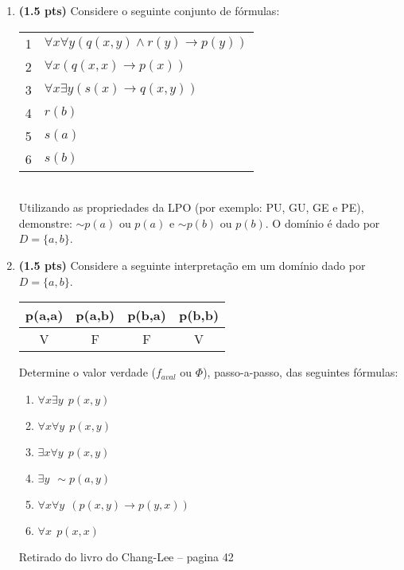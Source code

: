 \documentclass[11pt, a4paper,final]{article}
\begin{document}
\begin{enumerate}
\begin{comment}

\item {\bf (1.0 pt)} Utilizando o método de  {\em demonstração por condicional}  a validade do   argumento $ p \rightarrow u $, a partir das premissas:
$$ \{ p \vee q \rightarrow r,~ s \rightarrow \sim r \wedge \sim t,~ s \vee u \} ~\vdash~ p \rightarrow u $$
\end{comment}  


\item {\bf (1.5 pts)} Considere o seguinte conjunto de f\'ormulas: 

\begin{tabular}{ll}
1 &  $\forall x\forall y (q(x,y) \wedge r(y) \rightarrow p(y)) $ \\
2 &  $\forall x  (q(x,x) \rightarrow p(x))  $ \\
3 &  $\forall x \exists y ( s(x) \rightarrow q(x,y)) $ \\
4 &  $r(b)$ \\ 
5 &  $s(a)$ \\
6 &  $s(b)$ \\
\end{tabular}\\
Utilizando as propriedades da LPO (por exemplo: PU, GU, GE e PE), demonstre: $\sim p(a)$ ou $p(a)$ e $\sim p(b)$ ou $p(b)$.
O domínio é dado por $D=\{a,b\}$. 


\item {\bf (1.5 pts)} Considere a seguinte interpretação em um domínio dado por $D=\{a,b\}$. 

\begin{tabular}{c |c | c | c } \hline \hline 
p(a,a) & p(a,b)  & p(b,a) & p(b,b)  \\  \hline 
 V & F & F & V \\ \hline \hline 
\end{tabular}

Determine o valor verdade ($f_{aval}$  ou $\Phi $), passo-a-passo, das seguintes fórmulas:

\begin{enumerate}
\itemsep -2pt
\item $\forall x \exists y \:\: p(x,y) $
\item $\forall x \forall y \:\: p(x,y) $
\item $\exists x \forall y \:\: p(x,y) $
\item $\exists y \:\: \sim p(a,y) $
\item $\forall x \forall y \:\: (p(x,y) \rightarrow p(y,x)) $
\item $\forall x  \:\: p(x,x) $
\end{enumerate}
Retirado do livro do Chang-Lee -- pagina 42



\end{enumerate}
\end{document}
